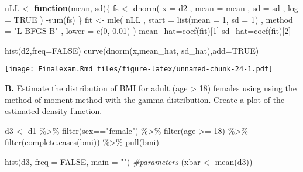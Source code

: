 \documentclass[
]{article}
\newenvironment{Shaded}{\begin{snugshade}}{\end{snugshade}}
\newcommand{\AttributeTok}[1]{\textcolor[rgb]{0.77,0.63,0.00}{#1}}
\newcommand{\CommentTok}[1]{\textcolor[rgb]{0.56,0.35,0.01}{\textit{#1}}}
\newcommand{\ConstantTok}[1]{\textcolor[rgb]{0.00,0.00,0.00}{#1}}
\newcommand{\ControlFlowTok}[1]{\textcolor[rgb]{0.13,0.29,0.53}{\textbf{#1}}}
\newcommand{\DecValTok}[1]{\textcolor[rgb]{0.00,0.00,0.81}{#1}}
\newcommand{\FloatTok}[1]{\textcolor[rgb]{0.00,0.00,0.81}{#1}}
\newcommand{\FunctionTok}[1]{\textcolor[rgb]{0.00,0.00,0.00}{#1}}
\newcommand{\NormalTok}[1]{#1}
\newcommand{\OtherTok}[1]{\textcolor[rgb]{0.56,0.35,0.01}{#1}}
\newcommand{\SpecialCharTok}[1]{\textcolor[rgb]{0.00,0.00,0.00}{#1}}
\newcommand{\StringTok}[1]{\textcolor[rgb]{0.31,0.60,0.02}{#1}}
\begin{document}
\begin{Shaded}
\begin{Highlighting}[]
\NormalTok{nLL }\OtherTok{\textless{}{-}} \ControlFlowTok{function}\NormalTok{(mean, sd)\{}
\NormalTok{  fs }\OtherTok{\textless{}{-}} \FunctionTok{dnorm}\NormalTok{(}
        \AttributeTok{x =}\NormalTok{ d2}
\NormalTok{      , }\AttributeTok{mean =}\NormalTok{ mean}
\NormalTok{      , }\AttributeTok{sd =}\NormalTok{ sd}
\NormalTok{      , }\AttributeTok{log =} \ConstantTok{TRUE}
\NormalTok{    ) }
  \SpecialCharTok{{-}}\FunctionTok{sum}\NormalTok{(fs)}
\NormalTok{\}}
\NormalTok{fit }\OtherTok{\textless{}{-}} \FunctionTok{mle}\NormalTok{(}
\NormalTok{    nLL}
\NormalTok{  , }\AttributeTok{start =} \FunctionTok{list}\NormalTok{(}\AttributeTok{mean =} \DecValTok{1}\NormalTok{, }\AttributeTok{sd =} \DecValTok{1}\NormalTok{)}
\NormalTok{  , }\AttributeTok{method =} \StringTok{"L{-}BFGS{-}B"}
\NormalTok{  , }\AttributeTok{lower =} \FunctionTok{c}\NormalTok{(}\DecValTok{0}\NormalTok{, }\FloatTok{0.01}\NormalTok{)}
\NormalTok{)}
\NormalTok{mean\_hat}\OtherTok{=}\FunctionTok{coef}\NormalTok{(fit)[}\DecValTok{1}\NormalTok{]}
\NormalTok{sd\_hat}\OtherTok{=}\FunctionTok{coef}\NormalTok{(fit)[}\DecValTok{2}\NormalTok{]}

\FunctionTok{hist}\NormalTok{(d2,}\AttributeTok{freq=}\ConstantTok{FALSE}\NormalTok{)}
\FunctionTok{curve}\NormalTok{(}\FunctionTok{dnorm}\NormalTok{(x,mean\_hat, sd\_hat),}\AttributeTok{add=}\ConstantTok{TRUE}\NormalTok{)}
\end{Highlighting}
\end{Shaded}

\texttt{[image: Finalexam.Rmd\_files/figure-latex/unnamed-chunk-24-1.pdf]}

\textbf{B.} Estimate the distribution of BMI for adult (age
\textgreater{} 18) females using using the method of moment method with
the gamma distribution. Create a plot of the estimated density function.

\begin{Shaded}
\begin{Highlighting}[]
\NormalTok{d3 }\OtherTok{\textless{}{-}}\NormalTok{ d1 }\SpecialCharTok{\%\textgreater{}\%} 
  \FunctionTok{filter}\NormalTok{(sex}\SpecialCharTok{==}\StringTok{"female"}\NormalTok{) }\SpecialCharTok{\%\textgreater{}\%} 
  \FunctionTok{filter}\NormalTok{(age }\SpecialCharTok{\textgreater{}=} \DecValTok{18}\NormalTok{) }\SpecialCharTok{\%\textgreater{}\%} 
  \FunctionTok{filter}\NormalTok{(}\FunctionTok{complete.cases}\NormalTok{(bmi)) }\SpecialCharTok{\%\textgreater{}\%} 
  \FunctionTok{pull}\NormalTok{(bmi)}

\FunctionTok{hist}\NormalTok{(d3, }\AttributeTok{freq =} \ConstantTok{FALSE}\NormalTok{, }\AttributeTok{main =} \StringTok{""}\NormalTok{)}
\CommentTok{\#parameters}
\NormalTok{(xbar }\OtherTok{\textless{}{-}} \FunctionTok{mean}\NormalTok{(d3))}
\end{Highlighting}
\end{Shaded}
\end{document}
